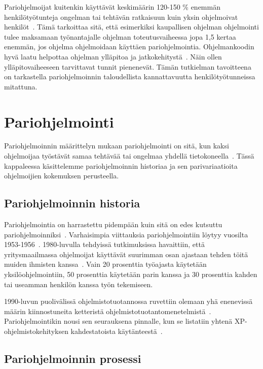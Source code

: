 \documentclass[finnish]{tktltiki2}
\theoremstyle{definition}
\theoremstyle{remark}
\begin{document}
Pariohjelmoijat kuitenkin käyttävät keskimäärin 120-150 \% enemmän henkilötyötunteja ongelman tai tehtävän ratkaisuun kuin yksin ohjelmoivat henkilöt~\cite{williams01support}. Tämä tarkoittaa sitä, että esimerkiksi kaupallisen ohjelman ohjelmointi tulee maksamaan työnantajalle ohjelman toteutusvaiheessa jopa 1,5 kertaa enemmän, jos ohjelma ohjelmoidaan käyttäen pariohjelmointia. Ohjelmankoodin hyvä laatu helpottaa ohjelman ylläpitoa ja jatkokehitystä~\cite{pearse95maintainability}. Näin ollen ylläpitovaiheeseen tarvittavat tunnit pienenevät. Tämän tutkielman tavoitteena on tarkastella pariohjelmoinnin taloudellista kannattavuutta henkilötyötunneissa mitattuna.

\section{Pariohjelmointi}

Pariohjelmoinnin määrittelyn mukaan pariohjelmointi on sitä, kun kaksi ohjelmoijaa työstävät samaa tehtävää tai ongelmaa yhdellä tietokoneella~\cite{nawrocki01exp}. Tässä kappaleessa käsittelemme pariohjelmoinnin historiaa ja sen parivariaatioita ohjelmoijien kokemuksen perusteella.

\subsection{Pariohjelmoinnin historia}

Pariohjelmointia on harrastettu pidempään kuin sitä on edes kutsuttu pariohjelmoinniksi~\cite{williams03pair}. Varhaisimpia viittauksia pariohjelmointiin löytyy vuosilta 1953-1956~\cite{williams96pair}. 1980-luvulla tehdyissä tutkimuksissa havaittiin, että yritysmaailmassa ohjelmoijat käyttävät suurimman osan ajastaan tehden töitä muiden ihmisten kanssa~\cite{lister87peopleware}. Vain 20 prosenttia työajasta käytetään yksilöohjelmointiin, 50 prosenttia käytetään parin kanssa ja 30 prosenttia kahden tai useamman henkilön kanssa työn tekemiseen.


1990-luvun puolivälissä ohjelmistotuotannossa ruvettiin olemaan yhä enenevissä määrin kiinnostuneita ketteristä ohjelmistotuotantomenetelmistä~\cite{martin2003agile}. Pariohjelmointikin nousi sen seurauksena pinnalle, kun se listatiin yhtenä XP-ohjelmistokehityksen kahdestatoista käytänteestä~\cite{beck00extreme}.

\subsection{Pariohjelmoinnin prosessi}
\end{document}
